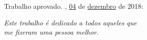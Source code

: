 \documentclass[
	12pt,				%
	openright,			%
	twoside,			%
	a4paper,			%
	english,			%
	french,				%
	spanish,			%
	brazil				%
	]{abntex2}
\begin{document}

%
% 
%
\begin{folhadeaprovacao}

  \begin{center}
    {\ABNTEXchapterfont\large\imprimirautor}

    \vspace*{\fill}\vspace*{\fill}
    \begin{center}
      \ABNTEXchapterfont\bfseries\Large\imprimirtitulo
    \end{center}
    \vspace*{\fill}

    \hspace{.45\textwidth}
    \begin{minipage}{.5\textwidth}
        \imprimirpreambulo
    \end{minipage}%
    \vspace*{\fill}
   \end{center}

   Trabalho aprovado. \imprimirlocal, \uline{04} de \uline{dezembro} de 2018:


   \begin{center}
    \vspace*{0.5cm}
    {\large\imprimirlocal}
    \par
    {\large\imprimirdata}
    \vspace*{1cm}
  \end{center}

\end{folhadeaprovacao}

\begin{dedicatoria}
   \vspace*{\fill}
   \centering
   \noindent
   \textit{ Este trabalho é dedicado a todos aqueles que\\
   me fizeram uma pessoa melhor.} \vspace*{\fill}
\end{dedicatoria}
\end{document}
